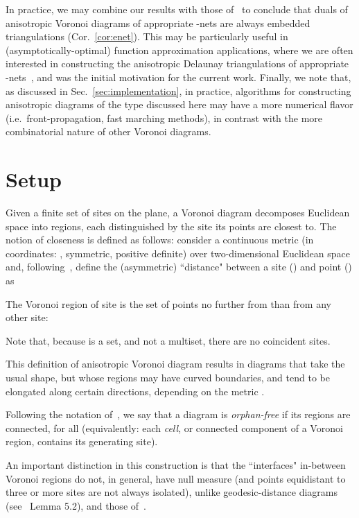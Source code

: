 \documentclass[11pt]{article}
\begin{document}
In practice, we may combine our results with those of~\cite{avd}  
to conclude that duals of anisotropic Voronoi diagrams of appropriate -nets 
are always embedded triangulations (Cor.~\ref{cor:enet}). 
This may be particularly useful in (asymptotically-optimal) function approximation applications, 
where we are often interested in 
constructing the anisotropic Delaunay triangulations of appropriate -nets~\cite{enets,GruberOQ}, and was the initial motivation for the current work. 
Finally, we note that, as discussed in Sec.~\ref{sec:implementation}, in practice, 
algorithms for constructing anisotropic diagrams of the type discussed here may have a more numerical flavor  
(i.e.\  front-propagation, fast marching methods), in contrast with the more combinatorial nature of other Voronoi diagrams. 




\section{Setup}\label{sec:setup}


Given a finite set  of sites on the plane, 
a Voronoi diagram decomposes Euclidean space into regions, each distinguished by the site
its points are closest to. 
The notion of closeness is defined as follows:
consider a continuous metric (in coordinates: , 
symmetric, positive definite) 
over two-dimensional Euclidean space and,
following~\cite{DW}, define the (asymmetric) ``distance" between a site
() and point () as



The Voronoi region of site  is the set of points no further from  than
from any other site:

Note that, because  is a set, and not a multiset, there are no coincident sites. 


This definition of anisotropic Voronoi diagram results in diagrams that take the usual shape, but
whose regions may have curved boundaries, and tend to be elongated along
certain directions, depending on the metric . 



Following the notation of~\cite{LS}, we say that a diagram is
\emph{orphan-free} if its regions  are connected, for all 
(equivalently: each \emph{cell}, or connected component of a Voronoi region, 
{contains} its generating site).



An important distinction in this construction is that  the ``interfaces" 
in-between Voronoi regions do not, in general, have null measure 
(and points equidistant to three or more sites are not always isolated), 
unlike geodesic-distance diagrams~\cite{LL2000} 
(see~\cite{enets} Lemma 5.2), and those of~\cite{LS}. 
\end{document}
